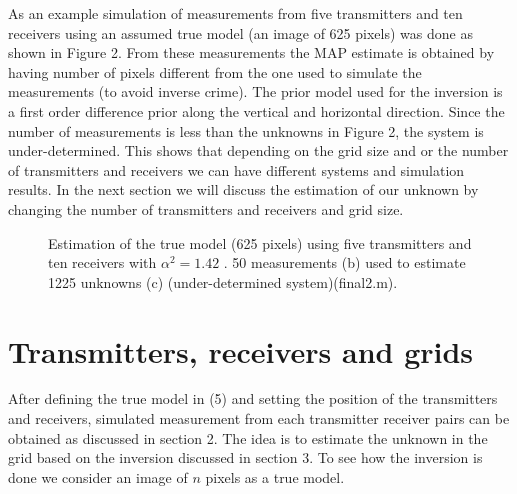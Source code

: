 \documentclass[12pt,A4]{article}
\begin{document}
As an example simulation of measurements from five transmitters and ten receivers using an assumed true model (an image of 625 pixels) was done as shown in Figure 2. From these measurements the MAP estimate is obtained by having number of pixels different from the one used to simulate the measurements (to avoid inverse crime). The prior model used for the inversion is a first order difference prior along the vertical and horizontal direction.
Since the number of measurements is less than the unknowns in Figure 2, the system is under-determined. This shows that depending on the grid size and or the number of transmitters and receivers we can have different systems and simulation results. In the next section we will discuss the estimation of our unknown by changing the number of transmitters and receivers and grid size.
\begin{center}
\begin{figure}[h]
{\par}
\caption{Estimation of the true model (625 pixels) using five transmitters and ten receivers with $\alpha^{2}=1.42$ . 50 measurements (b) used to estimate 1225 unknowns (c) (under-determined system)(final2.m).}
\end{figure}
\end{center}

\section{Transmitters, receivers and grids}
After defining the true model in (5) and setting the position of the transmitters and receivers, simulated measurement from each transmitter receiver pairs can be obtained as discussed in section 2. The idea is to estimate the unknown in the grid based on the inversion discussed in section 3. To see how the inversion is done we consider an image of $n$ pixels as a true model.
\end{document}
